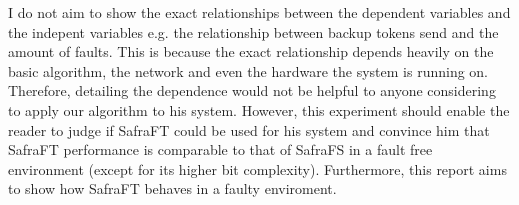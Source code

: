 I do not aim to show the exact relationships between the dependent variables and the indepent variables e.g. the relationship between backup tokens send and the amount of faults.
This is because the exact relationship depends heavily on the basic algorithm, the network and even the hardware the system is running on.
Therefore, detailing the dependence would not be helpful to anyone considering to apply our algorithm to his system.
However, this experiment should enable the reader to judge if SafraFT could be used for his system and convince him that SafraFT performance is comparable to that of SafraFS in a fault free environment (except for its higher bit complexity).
Furthermore, this report aims to show how SafraFT behaves in a faulty enviroment.



\begin{comment}
Hypothesis
  Safra compares to safra without signficant changes in with no failures on all network sizes
    tokens
    tokens after termination
    
      no signifcant change in token forwarding
    time ??
      no hard, complicated computations
    time after termination
      no hard, complicated computations and no change in token forwarding
  
  our Safra has higher bit complexity 
   increases linearly with network size network size of 1 == then upwards linearly

  Influence from faults
    backup tokens == number of faults - not correct
      difference caused by backup tokens / network size under same fault conditions?
      reason:  // Not to write here
        node gets to know about failing node because of token
          e.g. if its a bit further out and it gets the crashed message later
        node crash behind each other in the ring and only one backup token is send?
    Token count increases for a low level of faults as it colors nodes black and incurs in further rounds when node detects crash or when nodes gets to know of crash of successor	x
      These are mostly done during computation because CM is not processing heavy and gets passive a lot
      -> No change on tokens after termination
    Token count and time decrease for a high level of fault as network size is reduced. 
    Same for time spent
    
    Average token size grows as the crashes are propagated by the token each of them takes one round so impact on average token size depends on network size and the signficance also on number of rounds
      more noticable for many faults but than there are also less tokens also in that round
  \end{comment}
  
